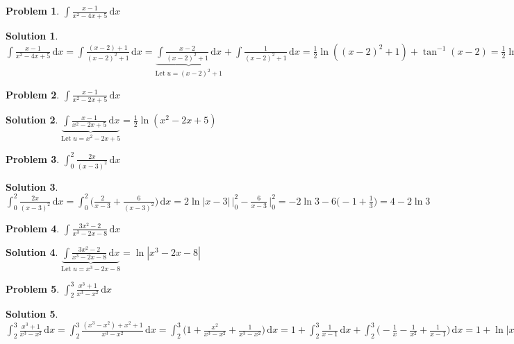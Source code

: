 \documentclass[11pt,a4paper]{article}
\newcommand{\ds}{\displaystyle}
\theoremstyle{definition}
\newtheorem*{problem}{Problem}
\newtheorem*{solution}{Solution}
\begin{document}
\begin{problem}
  $\ds\int\!\frac{x-1}{x^2-4x+5}\,\text{d}x$
\end{problem}

\begin{solution}
  $\ds\int\!\frac{x-1}{x^2-4x+5}\,\text{d}x = \int\!\frac{(x-2) + 1}{(x - 2)^2 + 1}\,\text{d}x = \underbrace{\int\!\frac{x - 2}{(x - 2)^2 + 1}\,\text{d}x}_{\text{Let}\;u = (x - 2)^2 + 1} + \int\!\frac{1}{(x - 2)^2 + 1}\,\text{d}x = \frac{1}{2}\ln((x - 2)^2 + 1) + \tan^{-1}(x - 2) = \frac{1}{2}\ln(x^2 - 4 x + 5) + \tan^{-1}(x - 2)$
\end{solution}

\begin{problem}
  $\ds\int\!\frac{x - 1}{x^2 - 2x + 5}\,\text{d}x$
\end{problem}

\begin{solution}
  $\ds\underbrace{\int\!\frac{x - 1}{x^2 - 2x + 5}\,\text{d}x}_{\text{Let}\;u = x^2 - 2x + 5} = \frac{1}{2}\ln(x^2 - 2x + 5)$
\end{solution}

\begin{problem}
  $\ds\int_0^2 \frac{2x}{(x-3)^2} \,\text{d}x$
\end{problem}

\begin{solution}
  $\ds\int_0^2 \frac{2x}{(x-3)^2} \,\text{d}x = \int_0^2\bigg(\frac{2}{x - 3} + \frac{6}{(x-3)^2}\bigg)\,\text{d}x = 2\ln|x - 3|\,\Big|_0^2 - \frac{6}{x - 3}\,\bigg|_0^2 = -2\ln 3 - 6\Big(-1 + \frac{1}{3}\Big) = 4 - 2\ln 3$
\end{solution}

\begin{problem}
  $\ds\int\!\frac{3x^2-2}{x^3-2x-8}\,\text{d}x$
\end{problem}

\begin{solution}
  $\ds\underbrace{\int\!\frac{3x^2 - 2}{x^3 - 2x - 8}\,\text{d}x}_{\text{Let}\;u = x^3 - 2x - 8} = \ln|x^3 - 2x - 8|$
\end{solution}

\begin{problem}
  $\ds\int_2^3 \frac{x^3 + 1}{x^3 - x^2} \,\text{d}x$
\end{problem}

\begin{solution}
  $\ds\int_2^3 \frac{x^3 + 1}{x^3 - x^2} \,\text{d}x = \int_2^3\frac{(x^3 - x^2) + x^2 + 1}{x^3 - x^2}\,\text{d}x = \int_2^3\bigg(1 + \frac{x^2}{x^3 - x^2} + \frac{1}{x^3 - x^2}\bigg)\,\text{d}x = 1 + \int_2^3\frac{1}{x - 1}\,\text{d}x + \int_2^3\bigg(-\frac{1}{x} - \frac{1}{x^2} + \frac{1}{x - 1}\bigg)\,\text{d}x = 1 + \ln|x - 1|\,\Big|_2^3 - \ln|x|\,\Big|_2^3 + \frac{1}{x}\,\Big|_2^3 + \ln|x - 1|\,\Big|_2^3 = 1 + \ln 2 - \frac{1}{6} -\ln\frac{3}{2} + \ln 2 = \frac{5}{6} + 3\ln 2 - \ln 3$
\end{solution}
\end{document}

